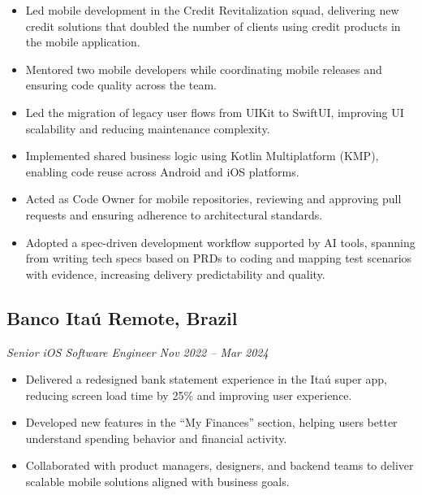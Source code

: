 \documentclass[a4paper,10pt]{article}
\begin{document}
\begin{itemize}

\item Led mobile development in the Credit Revitalization squad, delivering new credit solutions that doubled the number of clients using credit products in the mobile application.

\item Mentored two mobile developers while coordinating mobile releases and ensuring code quality across the team.

\item Led the migration of legacy user flows from UIKit to SwiftUI, improving UI scalability and reducing maintenance complexity.

\item Implemented shared business logic using Kotlin Multiplatform (KMP), enabling code reuse across Android and iOS platforms.

\item Acted as Code Owner for mobile repositories, reviewing and approving pull requests and ensuring adherence to architectural standards.

\item Adopted a spec-driven development workflow supported by AI tools, spanning from writing tech specs based on PRDs to coding and mapping test scenarios with evidence, increasing delivery predictability and quality.

\end{itemize}

\subsection*{\textbf{Banco Itaú} \hfill Remote, Brazil}
\textit{Senior iOS Software Engineer \hfill Nov 2022 – Mar 2024}

\begin{itemize}

\item Delivered a redesigned bank statement experience in the Itaú super app, reducing screen load time by 25\% and improving user experience.

\item Developed new features in the ``My Finances'' section, helping users better understand spending behavior and financial activity.

\item Collaborated with product managers, designers, and backend teams to deliver scalable mobile solutions aligned with business goals.

\end{itemize}
\end{document}
